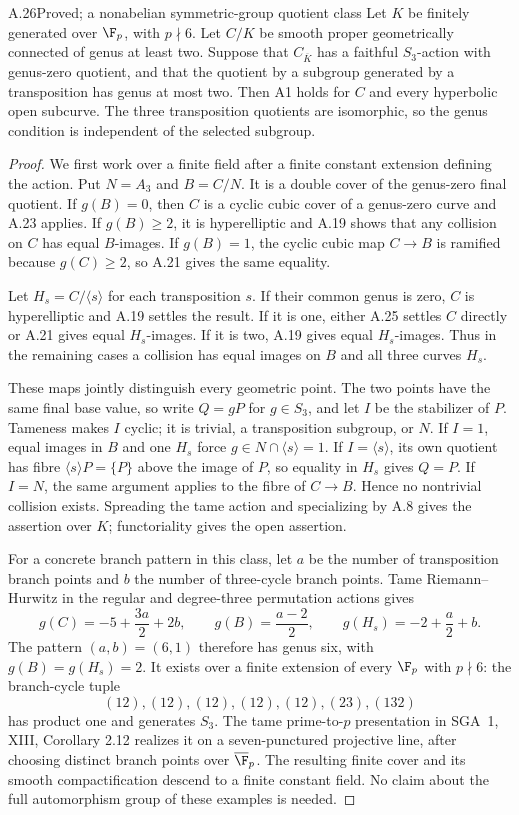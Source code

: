 \begin{claim}{A.26}{Proved; a nonabelian symmetric-group quotient class}
Let $K$ be finitely generated over $\F_p$, with
$p\nmid6$. Let $C/K$ be smooth proper geometrically
connected of genus at least two. Suppose that
$C_{\overline K}$ has a faithful $S_3$-action with
genus-zero quotient, and that the quotient by a subgroup
generated by a transposition has genus at most two.
Then A1 holds for $C$ and every hyperbolic open subcurve.
The three transposition quotients are isomorphic, so the
genus condition is independent of the selected subgroup.
\end{claim}
\begin{proof}
We first work over a finite field after a finite constant
extension defining the action. Put $N=A_3$ and $B=C/N$.
It is a double cover of the genus-zero final quotient.
If $g(B)=0$, then $C$ is a cyclic cubic cover of a
genus-zero curve and A.23 applies. If $g(B)\ge2$, it is
hyperelliptic and A.19 shows that any collision on $C$
has equal $B$-images. If $g(B)=1$, the cyclic cubic map
$C\to B$ is ramified because $g(C)\ge2$, so A.21 gives
the same equality.

Let $H_s=C/\langle s\rangle$ for each transposition $s$.
If their common genus is zero, $C$ is hyperelliptic and
A.19 settles the result. If it is one, either A.25
settles $C$ directly or A.21 gives equal $H_s$-images.
If it is two, A.19 gives equal $H_s$-images. Thus in the
remaining cases a collision has equal images on $B$ and
all three curves $H_s$.

These maps jointly distinguish every geometric point.
The two points have the same final base value, so write
$Q=gP$ for $g\in S_3$, and let $I$ be the stabilizer of
$P$. Tameness makes $I$ cyclic; it is trivial, a
transposition subgroup, or $N$. If $I=1$, equal images
in $B$ and one $H_s$ force
$g\in N\cap\langle s\rangle=1$. If
$I=\langle s\rangle$, its own quotient has fibre
$\langle s\rangle P=\{P\}$ above the image of $P$, so
equality in $H_s$ gives $Q=P$. If $I=N$, the same
argument applies to the fibre of $C\to B$. Hence no
nontrivial collision exists. Spreading the tame action
and specializing by A.8 gives the assertion over $K$;
functoriality gives the open assertion.

For a concrete branch pattern in this class, let $a$ be
the number of transposition branch points and $b$ the
number of three-cycle branch points. Tame
Riemann--Hurwitz in the regular and degree-three
permutation actions gives
\[
 g(C)=-5+\frac{3a}{2}+2b,\qquad
 g(B)=\frac{a-2}{2},\qquad
 g(H_s)=-2+\frac a2+b.
\]
The pattern $(a,b)=(6,1)$ therefore has genus six, with
$g(B)=g(H_s)=2$. It exists over a finite extension of
every $\F_p$ with $p\nmid6$: the branch-cycle tuple
\[
 (12),(12),(12),(12),(12),(23),(132)
\]
has product one and generates $S_3$. The tame
prime-to-$p$ presentation in SGA~1, XIII, Corollary 2.12
realizes it on a seven-punctured projective line, after
choosing distinct branch points over $\overline{\F}_p$.
The resulting finite cover and its smooth compactification
descend to a finite constant field. No claim about the
full automorphism group of these examples is needed.
\end{proof}

